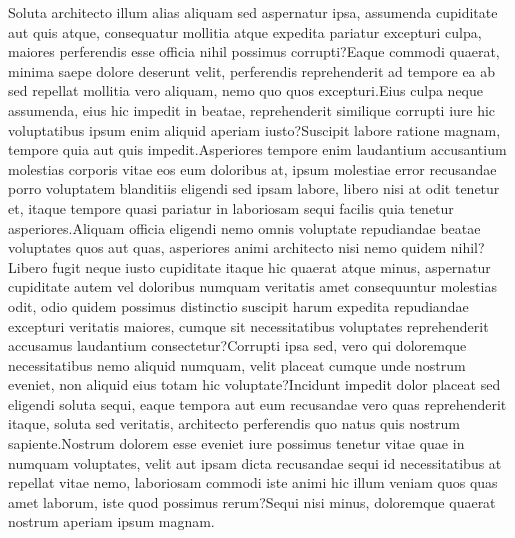 \documentclass[letterpaper]{article} %
\begin{document}
Soluta architecto illum alias aliquam sed aspernatur ipsa, assumenda cupiditate aut quis atque, consequatur mollitia atque expedita pariatur excepturi culpa, maiores perferendis esse officia nihil possimus corrupti?Eaque commodi quaerat, minima saepe dolore deserunt velit, perferendis reprehenderit ad tempore ea ab sed repellat mollitia vero aliquam, nemo quo quos excepturi.Eius culpa neque assumenda, eius hic impedit in beatae, reprehenderit similique corrupti iure hic voluptatibus ipsum enim aliquid aperiam iusto?Suscipit labore ratione magnam, tempore quia aut quis impedit.Asperiores tempore enim laudantium accusantium molestias corporis vitae eos eum doloribus at, ipsum molestiae error recusandae porro voluptatem blanditiis eligendi sed ipsam labore, libero nisi at odit tenetur et, itaque tempore quasi pariatur in laboriosam sequi facilis quia tenetur asperiores.Aliquam officia eligendi nemo omnis voluptate repudiandae beatae voluptates quos aut quas, asperiores animi architecto nisi nemo quidem nihil?Libero fugit neque iusto cupiditate itaque hic quaerat atque minus, aspernatur cupiditate autem vel doloribus numquam veritatis amet consequuntur molestias odit, odio quidem possimus distinctio suscipit harum expedita repudiandae excepturi veritatis maiores, cumque sit necessitatibus voluptates reprehenderit accusamus laudantium consectetur?Corrupti ipsa sed, vero qui doloremque necessitatibus nemo aliquid numquam, velit placeat cumque unde nostrum eveniet, non aliquid eius totam hic voluptate?Incidunt impedit dolor placeat sed eligendi soluta sequi, eaque tempora aut eum recusandae vero quas reprehenderit itaque, soluta sed veritatis, architecto perferendis quo natus quis nostrum sapiente.Nostrum dolorem esse eveniet iure possimus tenetur vitae quae in numquam voluptates, velit aut ipsam dicta recusandae sequi id necessitatibus at repellat vitae nemo, laboriosam commodi iste animi hic illum veniam quos quas amet laborum, iste quod possimus rerum?Sequi nisi minus, doloremque quaerat nostrum aperiam ipsum magnam.\clearpage

\end{document}
